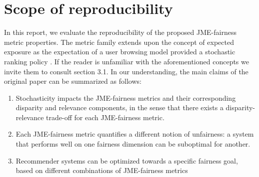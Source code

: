 


\section{Scope of reproducibility}
\label{sec:scope_reproducibility}

In this report, we evaluate the reproducibility of the proposed JME-fairness metric properties. The metric family extends upon the concept of expected exposure as the expectation of a user browsing model provided a stochastic ranking policy \cite{DBLP:Diaz}. If the reader is unfamiliar with the aforementioned concepts we invite them to consult section 3.1. In our understanding, the main claims of the original paper can be summarized as follows:

\begin{enumerate} %
    \item \label{itm: claim1} Stochasticity impacts the JME-fairness metrics and their corresponding disparity and relevance components, in the sense that there exists a disparity-relevance trade-off for each JME-fairness metric.
    \item \label{itm: claim2} Each JME-fairness metric quantifies a different notion of unfairness: a system that performs well on one fairness dimension can be suboptimal for another.
    \item \label{itm: claim3} Recommender systems can be optimized towards a specific fairness goal, based on different combinations of JME-fairness metrics
\end{enumerate}



